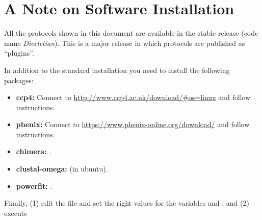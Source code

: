 \section{A Note on Software Installation}
  All the protocols shown in this document are available in the stable \scipion release (code name \textit{Diocletian}). This is a major release in which protocols are published as ``plugins''.


  In addition to the standard \scipion installation you need to install the following packages:
  
  \begin{itemize}
   \item\textbf{ccp4:} Connect to \url{http://www.ccp4.ac.uk/download/#os=linux} and follow instructions.
   \item\textbf{phenix:} Connect to \url{https://www.phenix-online.org/download/} and follow instructions.
   \item\textbf{chimera:} .
   \item\textbf{clustal-omega:}  (in ubuntu).
   \item\textbf{powerfit:} .
  \end{itemize}

  
  Finally, (1) edit the file  and set the right values for the variables  and , and (2) execute 
